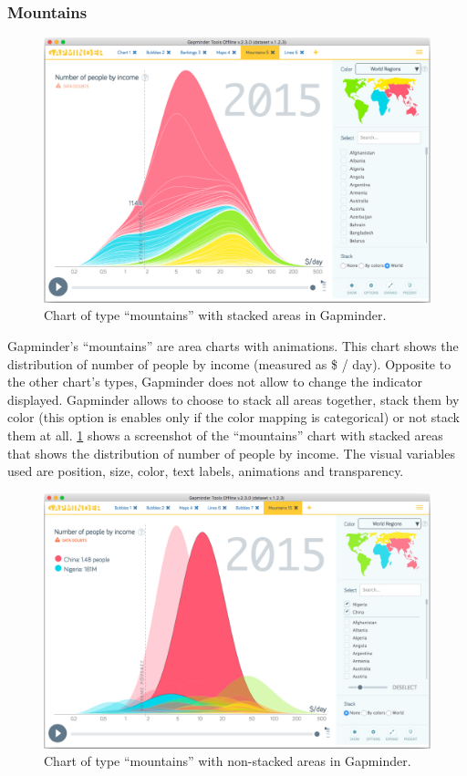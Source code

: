 \subsubsection{Mountains}
\label{subsubsec:mountains}
\begin{figure}[h]
	\centering
	\includegraphics[width=0.95\columnwidth]{figures/mountains}
	\caption{Chart of type ``mountains'' with stacked areas in Gapminder.}
	\label{fig:mountains}
\end{figure}

Gapminder's ``mountains'' are area charts with animations.
This chart shows the distribution of number of people by income (measured as \$ / day).
Opposite to the other chart's types, Gapminder does not allow to change the indicator displayed.
Gapminder allows to choose to stack all areas together, stack them by color (this option is enables only if the color mapping is categorical) or not stack them at all.
\cref{fig:mountains} shows a screenshot of the ``mountains'' chart with stacked areas that shows the distribution of number of people by income.
The visual variables used are position, size, color, text labels, animations and transparency.

\begin{figure}[h]
	\centering
	\includegraphics[width=0.95\columnwidth]{figures/mountains-non-stacked}
	\caption{Chart of type ``mountains'' with non-stacked areas in Gapminder.}
	\label{fig:mountains-non-stacked}
\end{figure}

